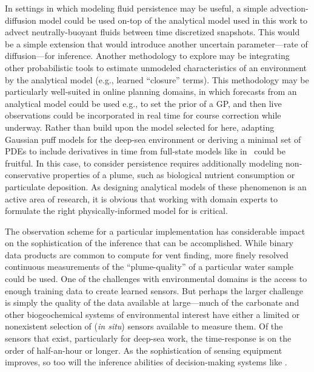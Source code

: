 In settings in which modeling fluid persistence may be useful, a simple advection-diffusion model could be used on-top of the analytical model used in this work to advect neutrally-buoyant fluids between time discretized snapshots. This would be a simple extension that would introduce another uncertain parameter---rate of diffusion---for inference. Another methodology to explore may be integrating other probabilistic tools to estimate unmodeled characteristics of an environment by the analytical model (e.g., learned ``closure'' terms). This methodology may be particularly well-suited in online planning domains, in which forecasts from an analytical model could be used e.g., to set the prior of a GP, and then live observations could be incorporated in real time for course correction while underway. Rather than build upon the model selected for \PHUMES here, adapting Gaussian puff models\autocite{ludwig1977simplification} for the deep-sea environment or deriving a minimal set of PDEs to include derivatives in time from full-state models like in~\cite{lavelle2013turbulent} could be fruitful. In this case, to consider persistence requires additionally modeling non-conservative properties of a plume, such as biological nutrient consumption or particulate deposition. As designing analytical models of these phenomenon is an active area of research, it is obvious that working with domain experts to formulate the right physically-informed model for \PHUMES is critical.

The observation scheme for a particular implementation has considerable impact on the sophistication of the inference that can be accomplished. While binary data products are common to compute for vent finding, more finely resolved continuous measurements of the ``plume-quality'' of a particular water sample could be used. One of the challenges with environmental domains is the access to enough training data to create learned sensors. But perhaps the larger challenge is simply the quality of the data available at large---much of the carbonate and other biogeochemical systems of environmental interest have either a limited or nonexistent selection of (\emph{in situ}) sensors available to measure them. Of the sensors that exist, particularly for deep-sea work, the time-response is on the order of half-an-hour or longer. As the sophistication of sensing equipment improves, so too will the inference abilities of decision-making systems like \PHORTEX. 

